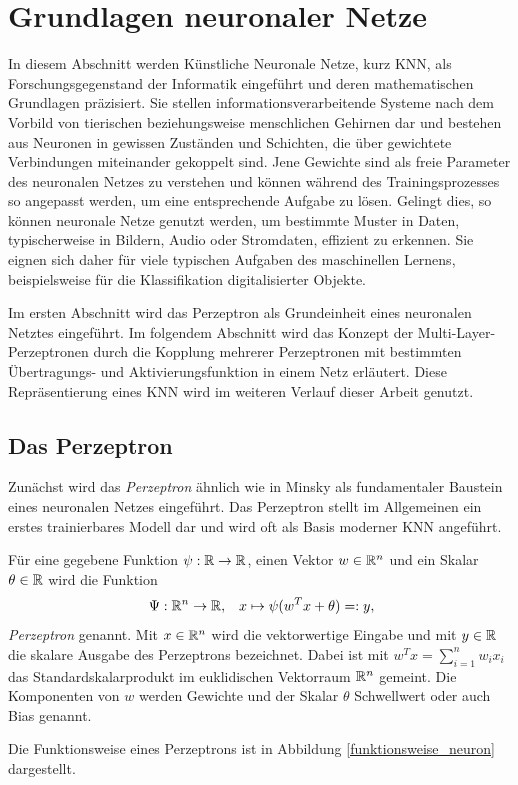 \chapter{Grundlagen neuronaler Netze}
\label{kapitel_neuralnetworks}

In diesem Abschnitt werden Künstliche Neuronale Netze\cite{dayhoff1990neural}, kurz KNN, als Forschungsgegenstand der Informatik eingeführt und deren mathematischen Grundlagen präzisiert. 
Sie stellen informationsverarbeitende Systeme nach dem Vorbild von tierischen beziehungsweise menschlichen Gehirnen dar und bestehen aus Neuronen in gewissen Zuständen und Schichten, die über gewichtete Verbindungen miteinander gekoppelt sind. Jene Gewichte sind als freie Parameter des neuronalen Netzes zu verstehen und können während des Trainingsprozesses so angepasst werden, um eine entsprechende Aufgabe zu lösen.  
Gelingt dies, so können neuronale Netze genutzt werden, um bestimmte Muster in Daten, typischerweise in Bildern, Audio oder Stromdaten, effizient zu erkennen\cite{pandya1995pattern, pao1989adaptive, urbaniak2021quality}.
Sie eignen sich daher für viele typischen Aufgaben des maschinellen Lernens, beispielsweise für die Klassifikation digitalisierter Objekte.

Im ersten Abschnitt wird das Perzeptron\cite{rosenblatt1958perceptron} als Grundeinheit eines neuronalen Netztes eingeführt. 
Im folgendem Abschnitt wird das Konzept der Multi-Layer-Perzeptronen\cite{werbos1988generalization} durch die Kopplung mehrerer Perzeptronen mit bestimmten Übertragungs- und Aktivierungsfunktion in einem Netz erläutert. Diese Repräsentierung eines KNN wird im weiteren Verlauf dieser Arbeit genutzt. 

\section{Das Perzeptron}
\label{perzeptron_abs}
Zunächst wird das \textit{Perzeptron} ähnlich wie in Minsky \cite{minsky2017perceptrons} als fundamentaler Baustein eines neuronalen Netzes eingeführt. Das Perzeptron stellt im Allgemeinen ein erstes trainierbares Modell dar und wird oft als Basis moderner KNN angeführt. 
\begin{defi}[Perzeptron]
    \label{def_neuron}
    Für eine gegebene Funktion $\psi: \mathbb{R} \rightarrow \mathbb{R}$, einen Vektor $w \in \mathbb{R}^{n}$ und ein Skalar $\theta \in \mathbb{R}$ wird die Funktion 
    \[ \
    \Psi: \mathbb{R}^n \rightarrow \mathbb{R}, \; \; \; x \mapsto \psi(w^T x +\theta)=:y,
    \]
    \textit{Perzeptron} genannt. Mit $x \in \mathbb{R}^{n}$ wird die vektorwertige Eingabe und mit $y \in \mathbb{R}$ die skalare Ausgabe des Perzeptrons bezeichnet. Dabei ist mit $w^Tx=\sum_{i=1}^n w_i x_i$ das Standardskalarprodukt im euklidischen Vektorraum $\mathbb{R}^{n}$ gemeint. Die Komponenten von $w$ werden Gewichte und der Skalar $\theta$ Schwellwert oder auch Bias genannt.
\end{defi}
Die Funktionsweise eines Perzeptrons ist in Abbildung \ref{funktionsweise_neuron} dargestellt.

